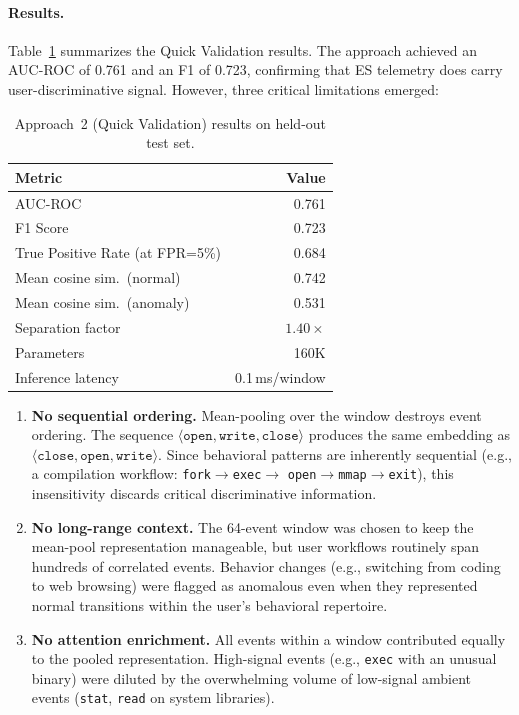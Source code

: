 \documentclass[letterpaper,twocolumn,10pt]{article}
\begin{document}
\paragraph{Results.}
Table~\ref{tab:a2_results} summarizes the Quick Validation
results.  The approach achieved an AUC-ROC of 0.761 and an F1 of
0.723, confirming that ES telemetry does carry user-discriminative
signal.  However, three critical limitations emerged:

\begin{table}[t]
\centering
\caption{Approach~2 (Quick Validation) results on held-out test
set.}
\label{tab:a2_results}
\small
\begin{tabular}{@{}lr@{}}
\toprule
\textbf{Metric} & \textbf{Value} \\
\midrule
AUC-ROC & 0.761 \\
F1 Score & 0.723 \\
True Positive Rate (at FPR=5\%) & 0.684 \\
Mean cosine sim.\ (normal) & 0.742 \\
Mean cosine sim.\ (anomaly) & 0.531 \\
Separation factor & $1.40\times$ \\
Parameters & 160K \\
Inference latency & 0.1\,ms/window \\
\bottomrule
\end{tabular}
\end{table}

\begin{enumerate}[nosep,leftmargin=*]
\item \textbf{No sequential ordering.}  Mean-pooling over the
  window destroys event ordering.  The sequence
  $\langle\texttt{open}, \texttt{write}, \texttt{close}\rangle$
  produces the same embedding as
  $\langle\texttt{close}, \texttt{open}, \texttt{write}\rangle$.
  Since behavioral patterns are inherently sequential (e.g., a
  compilation workflow: \texttt{fork}$\to$\texttt{exec}$\to$%
  \texttt{open}$\to$\texttt{mmap}$\to$\texttt{exit}), this
  insensitivity discards critical discriminative information.

\item \textbf{No long-range context.}  The 64-event window was
  chosen to keep the mean-pool representation manageable, but user
  workflows routinely span hundreds of correlated events.  Behavior
  changes (e.g., switching from coding to web browsing) were
  flagged as anomalous even when they represented normal
  transitions within the user's behavioral repertoire.

\item \textbf{No attention enrichment.}  All events within a window
  contributed equally to the pooled representation.  High-signal
  events (e.g., \texttt{exec} with an unusual binary) were diluted
  by the overwhelming volume of low-signal ambient events
  (\texttt{stat}, \texttt{read} on system libraries).
\end{enumerate}
\end{document}
